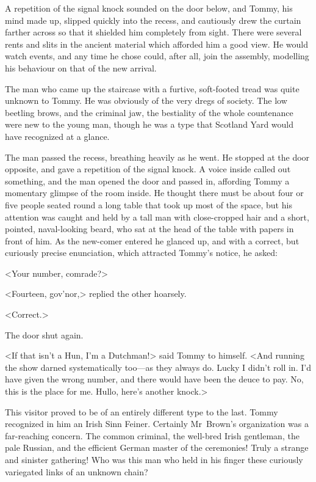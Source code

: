 A repetition of the signal knock sounded on the door below, and Tommy, his mind made up, slipped quickly into the recess, and cautiously drew the curtain farther across so that it shielded him completely from sight. There were several rents and slits in the ancient material which afforded him a good view. He would watch events, and any time he chose could, after all, join the assembly, modelling his behaviour on that of the new arrival.

The man who came up the staircase with a furtive, soft-footed tread was quite unknown to Tommy. He was obviously of the very dregs of society. The low beetling brows, and the criminal jaw, the bestiality of the whole countenance were new to the young man, though he was a type that Scotland Yard would have recognized at a glance.

The man passed the recess, breathing heavily as he went. He stopped at the door opposite, and gave a repetition of the signal knock. A voice inside called out something, and the man opened the door and passed in, affording Tommy a momentary glimpse of the room inside. He thought there must be about four or five people seated round a long table that took up most of the space, but his attention was caught and held by a tall man with close-cropped hair and a short, pointed, naval-looking beard, who sat at the head of the table with papers in front of him. As the new-comer entered he glanced up, and with a correct, but curiously precise enunciation, which attracted Tommy's notice, he asked:

<Your number, comrade?>

<Fourteen, gov'nor,> replied the other hoarsely.

<Correct.>

The door shut again.

<If that isn't a Hun, I'm a Dutchman!> said Tommy to himself. <And running the show darned systematically too—as they always do. Lucky I didn't roll in. I'd have given the wrong number, and there would have been the deuce to pay. No, this is the place for me. Hullo, here's another knock.>

This visitor proved to be of an entirely different type to the last. Tommy recognized in him an Irish Sinn Feiner. Certainly Mr~Brown's organization was a far-reaching concern. The common criminal, the well-bred Irish gentleman, the pale Russian, and the efficient German master of the ceremonies! Truly a strange and sinister gathering! Who was this man who held in his finger these curiously variegated links of an unknown chain?

